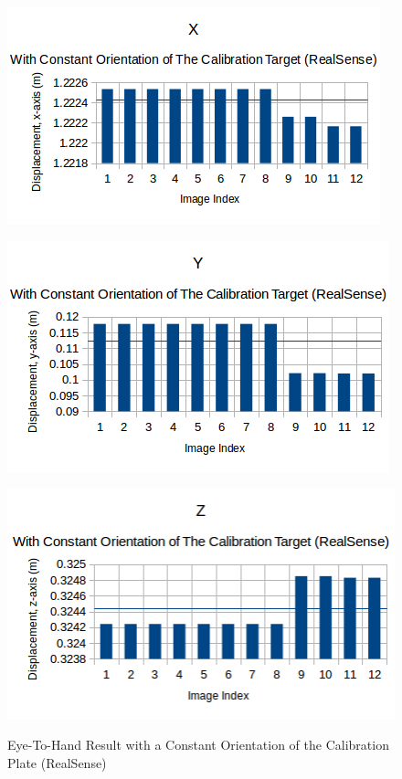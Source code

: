 \begin{figure}[htp]
\begin{center}
{
  \includegraphics[clip,width=0.5\columnwidth]{figures/real/constantorientation_real_x.png}%
}
\end{center}
\begin{center}
{
  \includegraphics[clip,width=0.5\columnwidth]{figures/real/constantorientation_real_y.png}%
}
\end{center}

\begin{center}
{
  \includegraphics[clip,width=0.5\columnwidth]{figures/real/constantorientation_real_z.png}%
}
\end{center}
\caption{Eye-To-Hand Result with a Constant Orientation of the Calibration Plate (RealSense)}
\end{figure}

